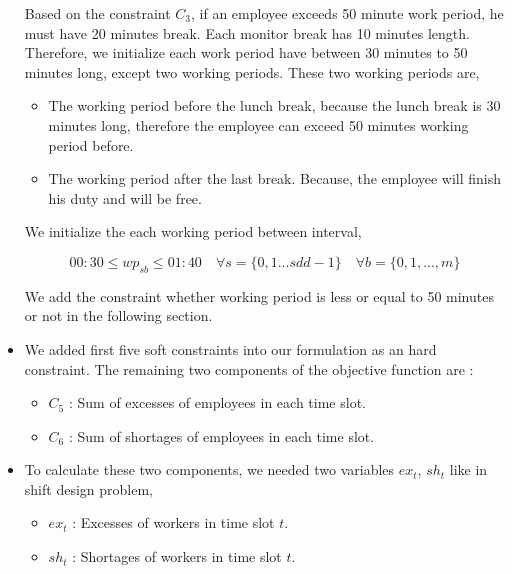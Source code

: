 \begin{itemize}
Based on the constraint $C_3$, if an employee exceeds 50 minute work period, he must have 20 minutes break. Each monitor break has 10 minutes length. Therefore, we initialize each work period have between 30 minutes to 50 minutes long, except two working periods. These two working periods are,

\begin{itemize}
\item The working period before the lunch break, because the lunch break is 30 minutes long, therefore the employee can exceed 50 minutes working period before. \\
\item The working period after the last break. Because, the employee will finish his duty and will be free.
\end{itemize}


We initialize the each working period between interval, 

\begin{equation}
00:30 \le wp_{sb} \le 01:40 \quad \forall s = \{0, 1 ...sdd -1\} \quad \forall b = \{0, 1, ..., m\}
\end{equation} 

We add the constraint whether working period is less or equal to 50 minutes or not in the following section. 

\item We added first five soft constraints into our formulation as an hard constraint. The remaining two components of the objective function are :
\begin{itemize}
\item $C_5$ : Sum of excesses of employees in each time slot. 

\item $C_6$ : Sum of shortages of employees in each time slot. \\
\end{itemize} 

\item To calculate these two components, we needed two variables $ex_t$, $sh_t$ like in shift design problem, 
\begin{itemize}
\item $ex_t$ : Excesses  of workers in time slot $t$.

\item $sh_t$ : Shortages of workers in time slot $t$. \\
\end{itemize}
\end{itemize}

